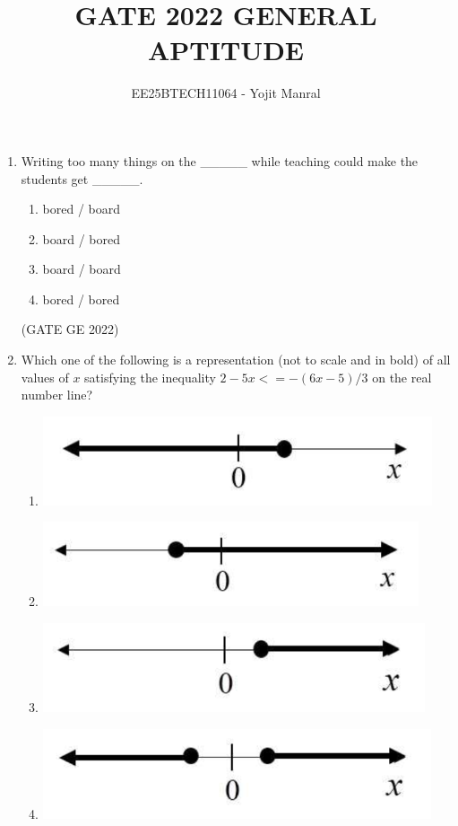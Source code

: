 \documentclass[a4paper, 11pt]{article}
\title{GATE 2022 GENERAL APTITUDE}
\author{EE25BTECH11064 - Yojit Manral}
\begin{document}
\maketitle

\begin{enumerate}

\textbf{Q.1 – Q.5 Carry ONE mark each.}

\item Writing too many things on the \_\_\_\_\_ while teaching could make the students get \_\_\_\_\_.
\begin{enumerate}
    \item bored / board
    \item board / bored
    \item board / board
    \item bored / bored
\end{enumerate}

\hfill (GATE GE 2022)

\item Which one of the following is a representation (not to scale and in bold) of all values of $x$ satisfying the inequality $2 - 5x <= - (6x - 5) / 3$ on the real number line?
\begin{enumerate}
    \item \includegraphics[width=\columnwidth]{figs/fig_2.1.png}
    \item \includegraphics[width=\columnwidth]{figs/fig_2.2.png}
    \item \includegraphics[width=\columnwidth]{figs/fig_2.3.png}
    \item \includegraphics[width=\columnwidth]{figs/fig_2.4.png}
\end{enumerate}


\end{enumerate}
\end{document}
